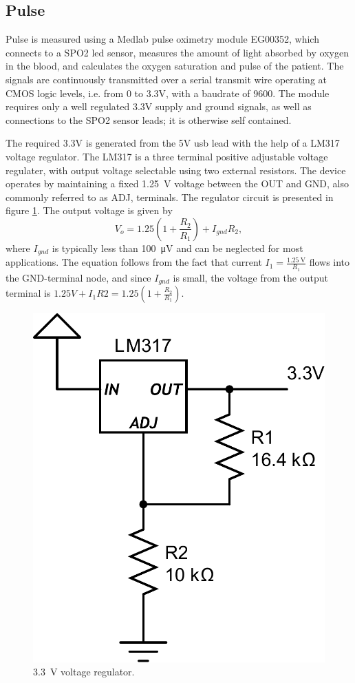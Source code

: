 \documentclass[a4paper,11pt]{article}
\begin{document}
\subsection*{Pulse}
Pulse is measured using a Medlab pulse oximetry module EG00352, which
connects to a SPO2 led sensor, measures the amount of light absorbed
by oxygen in the blood, and calculates the oxygen saturation and pulse
of the patient. The signals are continuously transmitted over a serial
transmit wire operating at CMOS logic levels, i.e. from 0 to 3.3V, with a baudrate of
9600. The module requires only a well regulated 3.3V supply and ground
signals, as well as connections to the SPO2 sensor leads; it is
otherwise self contained.

The required 3.3V is generated from the 5V usb lead with the help of a
LM317 voltage regulator. The LM317 is a three terminal positive
adjustable voltage regulater, with output voltage selectable using two
external resistors. The device operates by maintaining a fixed
\SI{1.25}{\volt} voltage between the OUT and GND, also commonly
referred to as ADJ, terminals. The regulator circuit is presented in
figure \ref{fig:3V-reg}. The output voltage is given by
\begin{equation}
  V_o = 1.25\left(1+\frac{R_2}{R_1}\right) + I_{gnd}R_2,
\end{equation}
where $I_{gnd}$ is typically less than \SI{100}{\micro\volt} and can
be neglected for most applications. The equation follows from the fact
that current $I_1 = \frac{\SI{1.25}{\volt}}{R_1}$ flows into the GND-terminal
node, and since $I_{gnd}$ is small, the voltage from the output
terminal is $1.25V + I_1R2 = 1.25(1+\frac{R_2}{R_1})$.
\begin{figure}[htb]   
  \caption{\SI{3.3}{\volt} voltage regulator.}
  \label{fig:3V-reg}
  \includegraphics[width=0.5\linewidth]{3v-regulator}
\end{figure}
\end{document}
